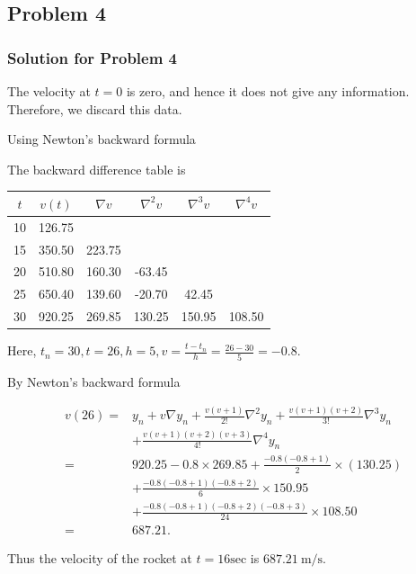 \documentclass{beamer}
\begin{document}
\subsection{Problem 4}
\begin{frame}
\frametitle{Solution for Problem 4}
The velocity at $t=0$ is zero, and hence it does not give any information. Therefore, we discard this data.

Using Newton's backward formula

The backward difference table is

\begin{center}
\begin{tabular}{|c|c|c|c|c|c|}
\hline
$t$ & $v(t)$ & $\nabla v$ & $\nabla^{2} v$ & $\nabla^{3} v$ & $\nabla^{4} v$ \\
\hline
10 & 126.75 &  &  &  &  \\
\hline
15 & 350.50 & 223.75 &  &  &  \\
\hline
20 & 510.80 & 160.30 & -63.45 &  &  \\
\hline
25 & 650.40 & 139.60 & -20.70 & 42.45 &  \\
\hline
30 & 920.25 & 269.85 & 130.25 & 150.95 & 108.50 \\
\hline
\end{tabular}
\end{center}

Here, $t_{n}=30, t=26, h=5, v=\frac{t-t_{n}}{h}=\frac{26-30}{5}=-0.8$.
\end{frame}
\begin{frame}{}
    
By Newton's backward formula

$$
\begin{aligned}
v(26)= & y_{n}+v \nabla y_{n}+\frac{v(v+1)}{2 !} \nabla^{2} y_{n}+\frac{v(v+1)(v+2)}{3 !} \nabla^{3} y_{n} \\
& +\frac{v(v+1)(v+2)(v+3)}{4 !} \nabla^{4} y_{n} \\
= & 920.25-0.8 \times 269.85+\frac{-0.8(-0.8+1)}{2} \times(130.25) \\
& +\frac{-0.8(-0.8+1)(-0.8+2)}{6} \times 150.95 \\
& +\frac{-0.8(-0.8+1)(-0.8+2)(-0.8+3)}{24} \times 108.50 \\
= & 687.21 .
\end{aligned}
$$

Thus the velocity of the rocket at $t=16 \mathrm{sec}$ is $687.21 \mathrm{~m} / \mathrm{s}$.
\end{frame}
\end{document}
